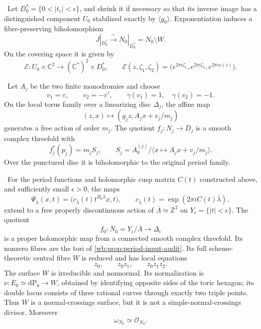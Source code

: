 \begin{proposition}
\label{wb:prop:candidate-cusp-overlap}
\ Let \(D_0^*=\{0<|t_c|<\epsilon\}\), and shrink it if necessary
so that its inverse image has a distinguished component \(U_0\) stabilized
exactly by \(\langle g_0\rangle\).  Exponentiation induces a
fibre-preserving biholomorphism
\[
 J|_{D_0^*}\xrightarrow{\ \sim\ }
 N_0|_{D_0^*}=N_0\setminus W.
\tag{2.8i}
\]
On the covering space it is given by
\[
 \mathcal E:U_0\times\mathbb C^2\longrightarrow
             (\mathbb C^*)^2\times D_0^*,
 \qquad
 \mathcal E(z,\zeta_1,\zeta_2)
 =\bigl(e^{2\pi i\zeta_1},e^{2\pi i\zeta_2},e^{2\pi is(z)}\bigr).
\tag{2.8ii}
\]
\end{proposition}

\begin{proposition}
\label{wb:prop:candidate-finite-fillings}
\ Let \(A_j\) be the two finite monodromies and choose
\[
 v_1=\varepsilon,\qquad v_2=-\varepsilon',
 \qquad \gamma(v_1)=1,\quad\gamma(v_2)=-1.
\]
On the local torus family over a linearizing disc \(\Delta_j\), the affine
map
\[
 (z,x)\longmapsto(g_jz,A_jx+v_j/m_j)
\tag{2.9}
\]
generates a free action of order \(m_j\).  The quotient
\(f_j:N_j\to D_j\) is a smooth complex threefold with
\[
 f_j^*(p_j)=m_jS_j,\qquad
 S_j=A_0^{(j)}/\langle x\mapsto A_jx+v_j/m_j\rangle.
\tag{2.10}
\]
Over the punctured disc it is biholomorphic to the original period family.
\end{proposition}

\begin{theorem}
\label{wb:thm:candidate-cusp-geometry}
\ For the period functions and holomorphic cusp matrix \(C(t)\)
constructed above, and sufficiently small \(\epsilon>0\), the maps
\[
 \Psi_{\bar\lambda}(x,t)=
 \bigl(c_{\bar\lambda}(t)t^{B_0\bar\lambda}x,t\bigr),
 \qquad
 c_{\bar\lambda}(t)=\exp(2\pi iC(t)\bar\lambda),
\tag{2.5}
\]
extend to a free properly discontinuous action of
\(\bar\Lambda\simeq\mathbb Z^2\) on
\(Y_\epsilon=\{|t|<\epsilon\}\).  The quotient
\[
 f_0:N_0=Y_\epsilon/\bar\Lambda\longrightarrow\Delta_\epsilon
\]
is a proper holomorphic map from a connected smooth complex threefold.
Its nonzero fibres are the tori of \cref{wb:prop:period-input-audit}.  Its full
scheme-theoretic central fibre \(W\) is reduced and has local equations
\[
 z_0,\qquad z_0z_1,\qquad z_0z_1z_2.
\tag{2.6}
\]
The surface \(W\) is irreducible and nonnormal.  Its normalization is
\(\nu:E_0\simeq\mathrm{dP}_6\to W\), obtained by identifying opposite sides
of the toric hexagon; its double locus consists of three rational curves
through exactly two triple points.  Thus \(W\) is a normal-crossings surface,
but it is not a simple-normal-crossings divisor.  Moreover
\[
 \omega_{N_0}\simeq\mathcal O_{N_0}.
\tag{2.6a}
\]
\end{theorem}

